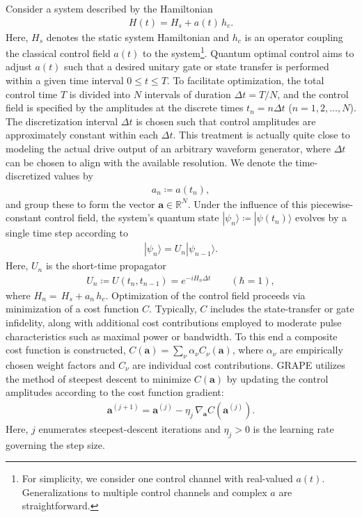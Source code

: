 \documentclass[letterpaper,10pt]{iopart}
\newcommand{\dket}[1]{|#1\rangle}
\newcommand{\parenthesis}[1]{\left(#1\right)}
\begin{document}
Consider a system described by the Hamiltonian
\begin{align}
     H(t) = H_s + a(t)\, h_c.
\end{align}
Here, $H_s$ denotes the static system Hamiltonian and $h_c$ is an operator coupling the classical control field $a(t)$ to the system\footnote{For simplicity, we consider one control channel with real-valued $a(t)$. Generalizations to multiple control channels and complex $a$ are straightforward.}. Quantum optimal control aims to adjust $a(t)$ such that a desired unitary gate or state transfer is performed within a given time interval $0\le t \le T$. To facilitate optimization, the total control time $T$ is divided into $N$ intervals of duration $\Delta t=T/N$, and the control field is specified by the amplitudes at the discrete times $t_n=n\Delta t$ ($n=1,2,\dots,N$). The discretization interval $\Delta t$ is chosen such that control amplitudes are approximately constant within each $\Delta t$. This treatment is actually quite close to modeling the actual drive output of an arbitrary waveform generator, where $\Delta t$ can be chosen to align with the available resolution. We denote the time-discretized values by
\begin{align}
\label{eq2}
    a_n \coloneqq a(t_n),
\end{align}
and group these to form the vector $\textbf{a}\in \mathbb{R}^{N}$.  
Under the influence of this piecewise-constant control field, the system's quantum state $\dket{\psi_n}\coloneqq \dket{\psi(t_n)}$ evolves by a single time step according to 
\begin{align}
\label{statepropagation}
  |\psi_n\rangle=U_n|\psi_{n-1}\rangle.
\end{align}
Here, $U_n$ is the short-time propagator
\begin{align}
\label{propagator}
  U_n\coloneqq U(t_n, t_{n-1}) =e^{-iH_n\Delta t}\qquad(\hbar=1),
\end{align}
where $H_n=\, H_s+a_n\, h_c $. Optimization of the control field proceeds via minimization of a cost function $C$. Typically, $C$ includes the state-transfer or gate infidelity, along with additional cost contributions employed to moderate pulse characteristics such as maximal power or bandwidth. To this end a composite cost function is constructed, $C(\textbf{a})=\sum_{\nu}\alpha_\nu C_\nu \parenthesis{\textbf{a}}$, where $\alpha_\nu$ are empirically chosen weight factors and $C_\nu$ are individual cost contributions. GRAPE utilizes the method of steepest descent to minimize $C(\textbf{a})$ by updating the control amplitudes according to the cost function gradient: 
\begin{align}
  \textbf{a}^{(j+1)}=\textbf{a}^{(j)}-\eta_j\,\nabla_{\textbf{a}}C(\textbf{a}^{(j)}).
\end{align}
Here, $j$ enumerates steepest-descent iterations and $\eta_j>0$ is the learning rate governing the step size. 
\end{document}
